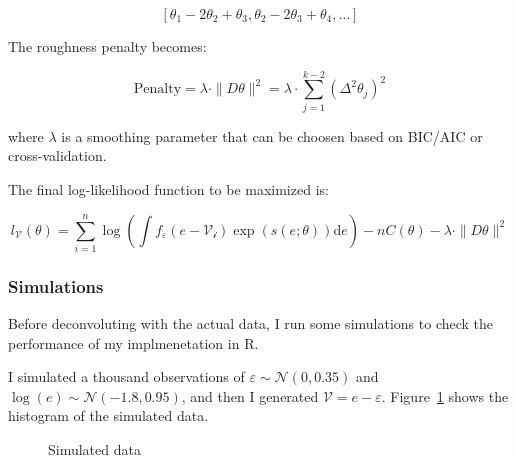 \documentclass[
  12pt]{article}
\theoremstyle{definition}
\theoremstyle{remark}
\begin{document}
\[
\left[ \theta_1 - 2\theta_2 + \theta_3, \theta_2 - 2\theta_3 + \theta_4, \dots \right]
\]

The roughness penalty becomes:

\[
\text{Penalty} = \lambda \cdot \| D \theta \|^2 = \lambda \cdot \sum_{j=1}^{k-2} (\Delta^2 \theta_j)^2
\]

where \(\lambda\) is a smoothing parameter that can be choosen based on
BIC/AIC or cross-validation.

The final log-likelihood function to be maximized is:

\[
l_{\mathcal{V}}(\theta) = \sum_{i=1}^{n}\log \left(\int f_{\varepsilon}(e-\mathcal{V_i})\exp(s(e;\theta))\text{d}e\right)-nC(\theta) - \lambda \cdot \| D \theta \|^2
\]

\subsubsection{Simulations}\label{simulations}

Before deconvoluting with the actual data, I run some simulations to
check the performance of my implmenetation in R.

I simulated a thousand observations of
\(\varepsilon \sim \mathcal{N}(0,0.35)\) and
\(\log(e) \sim \mathcal{N}(-1.8,0.95)\), and then I generated
\(\mathcal{V} = e - \varepsilon\). Figure~\ref{fig-simulated-data} shows
the histogram of the simulated data.

\begin{figure}


\caption{\label{fig-simulated-data}Simulated data}

\end{figure}%
\end{document}
